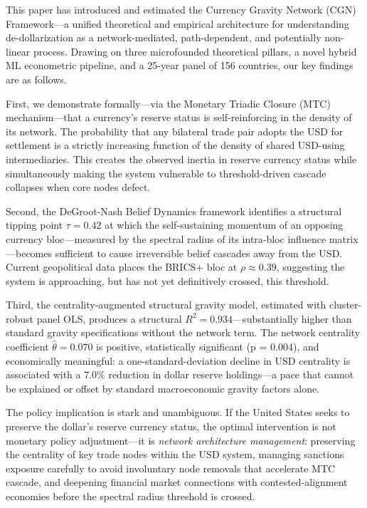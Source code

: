 \documentclass[12pt, letterpaper]{article}
\theoremstyle{definition}
\begin{document}
This paper has introduced and estimated the Currency Gravity Network (CGN) Framework---a unified theoretical and empirical architecture for understanding de-dollarization as a network-mediated, path-dependent, and potentially non-linear process. Drawing on three microfounded theoretical pillars, a novel hybrid ML econometric pipeline, and a 25-year panel of 156 countries, our key findings are as follows.

First, we demonstrate formally---via the Monetary Triadic Closure (MTC) mechanism---that a currency's reserve status is self-reinforcing in the density of its network. The probability that any bilateral trade pair adopts the USD for settlement is a strictly increasing function of the density of shared USD-using intermediaries. This creates the observed inertia in reserve currency status while simultaneously making the system vulnerable to threshold-driven cascade collapses when core nodes defect.

Second, the DeGroot-Nash Belief Dynamics framework identifies a structural tipping point $\tau = 0.42$ at which the self-sustaining momentum of an opposing currency bloc---measured by the spectral radius of its intra-bloc influence matrix---becomes sufficient to cause irreversible belief cascades away from the USD. Current geopolitical data places the BRICS+ bloc at $\rho \approx 0.39$, suggesting the system is approaching, but has not yet definitively crossed, this threshold.

Third, the centrality-augmented structural gravity model, estimated with cluster-robust panel OLS, produces a structural $R^2 = 0.934$---substantially higher than standard gravity specifications without the network term. The network centrality coefficient $\hat\theta = 0.070$ is positive, statistically significant (p = 0.004), and economically meaningful: a one-standard-deviation decline in USD centrality is associated with a 7.0\% reduction in dollar reserve holdings---a pace that cannot be explained or offset by standard macroeconomic gravity factors alone.

The policy implication is stark and unambiguous. If the United States seeks to preserve the dollar's reserve currency status, the optimal intervention is not monetary policy adjustment---it is \textit{network architecture management}: preserving the centrality of key trade nodes within the USD system, managing sanctions exposure carefully to avoid involuntary node removals that accelerate MTC cascade, and deepening financial market connections with contested-alignment economies before the spectral radius threshold is crossed.
\end{document}
